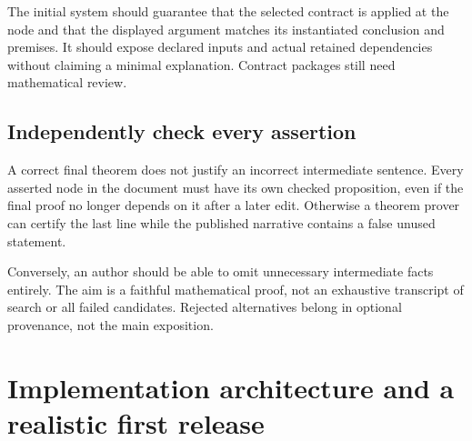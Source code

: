 \documentclass[11pt,letterpaper]{article}
\theoremstyle{definition}\newtheorem{definition}[theorem]{Definition}
\begin{document}
The initial system should guarantee that the selected contract is applied at the node and that the displayed argument matches its instantiated conclusion and premises. It should expose declared inputs and actual retained dependencies without claiming a minimal explanation. Contract packages still need mathematical review.

\subsection{Independently check every assertion}
A correct final theorem does not justify an incorrect intermediate sentence. Every asserted node in the document must have its own checked proposition, even if the final proof no longer depends on it after a later edit. Otherwise a theorem prover can certify the last line while the published narrative contains a false unused statement.

Conversely, an author should be able to omit unnecessary intermediate facts entirely. The aim is a faithful mathematical proof, not an exhaustive transcript of search or all failed candidates. Rejected alternatives belong in optional provenance, not the main exposition.

\section{Implementation architecture and a realistic first release}\label{sec:implementation}
\end{document}
